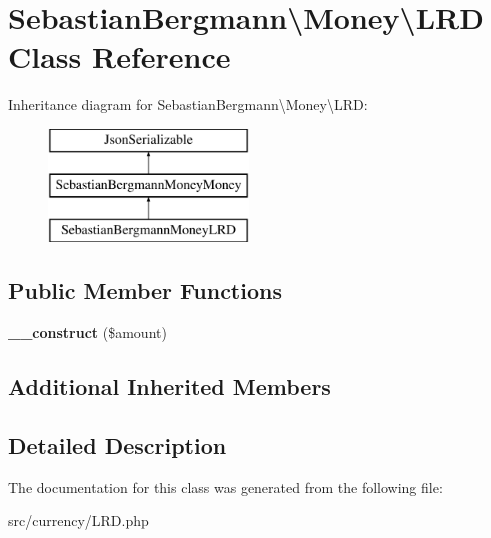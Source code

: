 \hypertarget{classSebastianBergmann_1_1Money_1_1LRD}{}\section{Sebastian\+Bergmann\textbackslash{}Money\textbackslash{}L\+R\+D Class Reference}
\label{classSebastianBergmann_1_1Money_1_1LRD}
Inheritance diagram for Sebastian\+Bergmann\textbackslash{}Money\textbackslash{}L\+R\+D\+:\begin{figure}[H]
\begin{center}
\leavevmode
\includegraphics[height=3.000000cm]{classSebastianBergmann_1_1Money_1_1LRD}
\end{center}
\end{figure}
\subsection*{Public Member Functions}
\begin{DoxyCompactItemize}
\item 
\hypertarget{classSebastianBergmann_1_1Money_1_1LRD_af8484538f897208e03c43b37c35f952b}{}{\bfseries \+\_\+\+\_\+construct} (\$amount)\label{classSebastianBergmann_1_1Money_1_1LRD_af8484538f897208e03c43b37c35f952b}

\end{DoxyCompactItemize}
\subsection*{Additional Inherited Members}


\subsection{Detailed Description}


The documentation for this class was generated from the following file\+:\begin{DoxyCompactItemize}
\item 
src/currency/L\+R\+D.\+php\end{DoxyCompactItemize}
